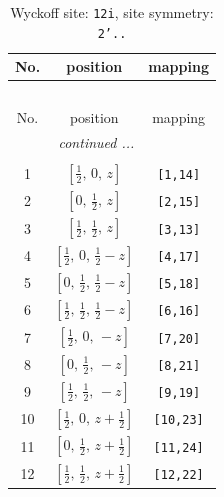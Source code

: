 \documentclass[fleqn,8pt]{jsarticle}
\begin{document}
\begin{longtable}{ccc}
\caption{Wyckoff site: {\tt 12i}, site symmetry: {\tt 2'..}}
 \\
 \hline \hline
No. & position & mapping \\ \hline \endfirsthead

\multicolumn{2}{l}{\tablename\ \thetable{}} \\
 \hline \hline
No. & position & mapping \\ \hline \endhead

 \hline \hline
\multicolumn{2}{r}{\footnotesize\it continued ...} \\ \endfoot

 \hline \hline
\multicolumn{2}{r}{} \\ \endlastfoot

1 & $\left[ \frac{1}{2},\, 0,\, z \right]$ & {\tt [1,14]} \\ \hline
2 & $\left[ 0,\, \frac{1}{2},\, z \right]$ & {\tt [2,15]} \\ \hline
3 & $\left[ \frac{1}{2},\, \frac{1}{2},\, z \right]$ & {\tt [3,13]} \\ \hline
4 & $\left[ \frac{1}{2},\, 0,\, \frac{1}{2} - z \right]$ & {\tt [4,17]} \\ \hline
5 & $\left[ 0,\, \frac{1}{2},\, \frac{1}{2} - z \right]$ & {\tt [5,18]} \\ \hline
6 & $\left[ \frac{1}{2},\, \frac{1}{2},\, \frac{1}{2} - z \right]$ & {\tt [6,16]} \\ \hline
7 & $\left[ \frac{1}{2},\, 0,\, - z \right]$ & {\tt [7,20]} \\ \hline
8 & $\left[ 0,\, \frac{1}{2},\, - z \right]$ & {\tt [8,21]} \\ \hline
9 & $\left[ \frac{1}{2},\, \frac{1}{2},\, - z \right]$ & {\tt [9,19]} \\ \hline
10 & $\left[ \frac{1}{2},\, 0,\, z + \frac{1}{2} \right]$ & {\tt [10,23]} \\ \hline
11 & $\left[ 0,\, \frac{1}{2},\, z + \frac{1}{2} \right]$ & {\tt [11,24]} \\ \hline
12 & $\left[ \frac{1}{2},\, \frac{1}{2},\, z + \frac{1}{2} \right]$ & {\tt [12,22]} \\
\end{longtable}
\renewcommand{\arraystretch}{1.2}
\end{document}
